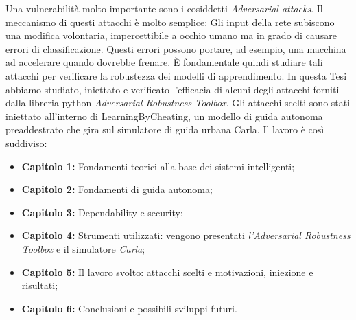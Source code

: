 Una vulnerabilità molto importante sono i cosiddetti \emph{Adversarial attacks}. Il meccanismo di questi attacchi è molto semplice:
Gli input della rete  subiscono una modifica volontaria, impercettibile a occhio umano ma in grado di causare errori di  classificazione.  Questi errori possono portare, ad esempio, una macchina ad accelerare quando
dovrebbe frenare. È fondamentale quindi studiare tali attacchi per verificare la robustezza dei modelli di apprendimento.
In questa Tesi abbiamo studiato, iniettato e verificato l'efficacia di  alcuni degli attacchi forniti dalla libreria python \emph{Adversarial Robustness Toolbox}. Gli attacchi scelti sono stati iniettato all'interno
di LearningByCheating, un modello di guida autonoma preaddestrato che gira sul simulatore di guida urbana Carla.
Il lavoro è così suddiviso:
\begin{itemize}
  \item \textbf{Capitolo 1:} Fondamenti teorici alla base dei sistemi intelligenti;
  \item \textbf{Capitolo 2:} Fondamenti di guida autonoma;
  \item \textbf{Capitolo 3:} Dependability e security;
  \item \textbf{Capitolo 4:} Strumenti utilizzati: vengono presentati \emph{l'Adversarial Robustness Toolbox} e il simulatore \emph{Carla};
  \item \textbf{Capitolo 5:} Il lavoro svolto: attacchi scelti e motivazioni, iniezione e risultati;
  \item \textbf{Capitolo 6:} Conclusioni e possibili sviluppi futuri.
  
\end{itemize}


